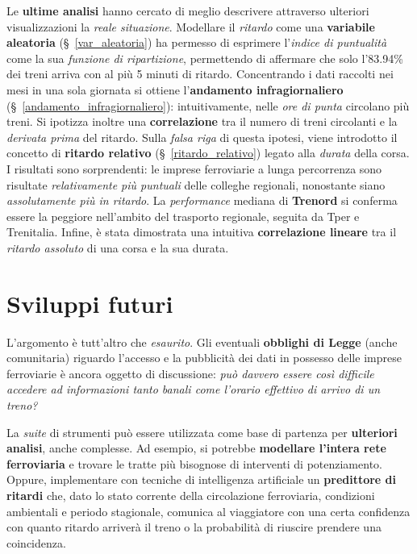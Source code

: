 \documentclass[12pt,a4paper,italian]{report}
\begin{document}
Le \textbf{ultime analisi} hanno cercato di meglio descrivere
attraverso ulteriori visualizzazioni la \textit{reale situazione}.
Modellare il \textit{ritardo} come una \textbf{variabile aleatoria}
(\S~\ref{var_aleatoria}) ha permesso di esprimere l'\textit{indice di
    puntualità} come la sua \textit{funzione di ripartizione},
permettendo di affermare che solo l'83.94\% dei treni arriva con al
più 5 minuti di ritardo.
Concentrando i dati raccolti nei mesi in una
sola giornata si ottiene l'\textbf{andamento infragiornaliero}
(\S~\ref{andamento_infragiornaliero}): intuitivamente, nelle
\textit{ore di punta} circolano più treni.  Si ipotizza inoltre una
\textbf{correlazione} tra il numero di treni circolanti e la
\textit{derivata prima} del ritardo.  Sulla \textit{falsa riga} di
questa ipotesi, viene introdotto il concetto di \textbf{ritardo
    relativo} (\S~\ref{ritardo_relativo}) legato alla \textit{durata}
della corsa.  I risultati sono sorprendenti: le imprese ferroviarie a
lunga percorrenza sono risultate \textit{relativamente più puntuali}
delle colleghe regionali, nonostante siano \textit{assolutamente più
    in ritardo}.  La \textit{performance} mediana di \textbf{Trenord}
si conferma essere la peggiore nell'ambito del trasporto regionale,
seguita da Tper e Trenitalia.  Infine, è stata dimostrata una
intuitiva \textbf{correlazione lineare} tra il \textit{ritardo
    assoluto} di una corsa e la sua durata.

\section*{Sviluppi futuri}

L'argomento è tutt'altro che \textit{esaurito}.  Gli eventuali
\textbf{obblighi di Legge} (anche comunitaria) riguardo l'accesso e la
pubblicità dei dati in possesso delle imprese ferroviarie è ancora
oggetto di discussione: \textit{può davvero essere così difficile
    accedere ad informazioni tanto banali come l'orario effettivo di
    arrivo di un treno?}

La \textit{suite} di strumenti può essere utilizzata come base di
partenza per \textbf{ulteriori analisi}, anche complesse.  Ad esempio,
si potrebbe \textbf{modellare l'intera rete ferroviaria} e trovare le
tratte più bisognose di interventi di potenziamento.  Oppure,
implementare con tecniche di intelligenza artificiale un
\textbf{predittore di ritardi} che, dato lo stato corrente della
circolazione ferroviaria, condizioni ambientali e periodo stagionale,
comunica al viaggiatore con una certa confidenza con quanto ritardo
arriverà il treno o la probabilità di riuscire prendere una
coincidenza.
\end{document}
